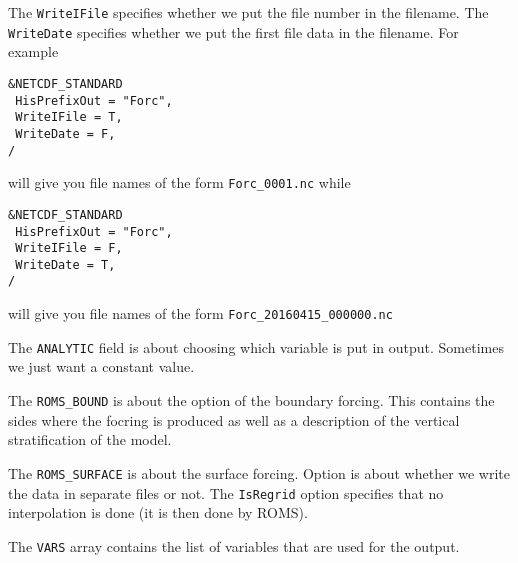 \documentclass[12pt]{amsart}
\begin{document}
The {\tt WriteIFile} specifies whether we put the file number in the filename. The {\tt WriteDate} specifies whether we put the first file data in the filename.
For example
\begin{verbatim}
&NETCDF_STANDARD
 HisPrefixOut = "Forc",
 WriteIFile = T,
 WriteDate = F,
/
\end{verbatim}
will give you file names of the form {\tt Forc\_0001.nc} while
\begin{verbatim}
&NETCDF_STANDARD
 HisPrefixOut = "Forc",
 WriteIFile = F,
 WriteDate = T,
/
\end{verbatim}
will give you file names of the form {\tt Forc\_20160415\_000000.nc}

The {\tt ANALYTIC} field is about choosing which variable is put in output. Sometimes we just want a constant value.

The {\tt ROMS\_BOUND} is about the option of the boundary forcing. This contains the sides where the focring is produced as well as a description of the vertical stratification of the model.

The {\tt ROMS\_SURFACE} is about the surface forcing. Option is about whether we write the data in separate files or not. The {\tt IsRegrid} option specifies that no interpolation is done (it is then done by ROMS).


The {\tt VARS} array contains the list of variables that are used for the output.
\end{document}
